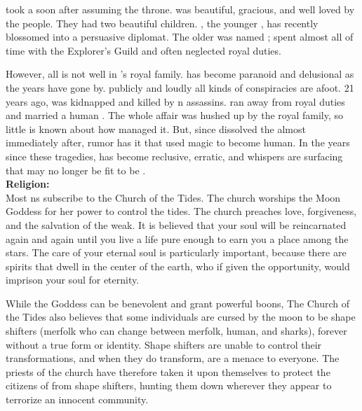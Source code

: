 \documentclass[blue]{NeptuneBall}
\begin{document}
\cKing{\King} \cKing{} took a \cQueen{\spouse} soon after assuming the throne. \cQueen{\King} \cQueen{} was beautiful, gracious, and well loved by the people. They had two beautiful children. \cPrincess{\Prince} \cPrincess{}, the younger \cPrincess{\offspring}, has recently blossomed into a persuasive diplomat. The older \cAriel{\Prince} was named \cAriel{}; \cAriel{} spent almost all of \cAriel{\their} time with the Explorer's Guild and often neglected \cAriel{\their} royal duties. 

However, all is not well in \pAtlantis{}'s royal family. \cPlant{\Prince} \cPlant{} has become paranoid and delusional as the years have gone by. \cPlant{\They} publicly and loudly  all kinds of conspiracies are afoot. 21 years ago, \cQueen{\King} \cQueen{} was kidnapped and killed by \pPacifica{}n assassins. \cAriel{\Prince} \cAriel{} ran away from \cAriel{\their} royal duties and married a human \cEric{\prince}. The whole affair was hushed up by the royal family, so little is known about how \cAriel{\they{}} managed it. But, since \cKing{} dissolved the \pMagician{} almost immediately after, rumor has it that \cAriel{\they} used magic to become human. In the years since these tragedies, \cKing{} has become reclusive, erratic, and whispers are surfacing that \cKing{\they{}} may no longer be fit to be \cKing{\King}.\\

{\bf Religion:}\\
Most \pAtlantis{}ns subscribe to the Church of the Tides. The church worships the Moon Goddess for her power to control the tides. The church preaches love, forgiveness, and the salvation of the weak. It is believed that your soul will be reincarnated again and again until you live a life pure enough to earn you a place among the stars. The care of your eternal soul is particularly important, because there are spirits that dwell in the center of the earth, who if given the opportunity, would imprison your soul for eternity.

While the Goddess can be benevolent and grant powerful boons, The Church of the Tides also believes that some individuals are cursed by the moon to be shape shifters (merfolk who can change between merfolk, human, and sharks), forever without a true form or identity. Shape shifters are unable to control their transformations, and when they do transform, are a menace to everyone. The priests of the church have therefore taken it upon themselves to protect the citizens of \pAtlantis{} from shape shifters, hunting them down wherever they appear to terrorize an innocent community.\\
\end{document}
